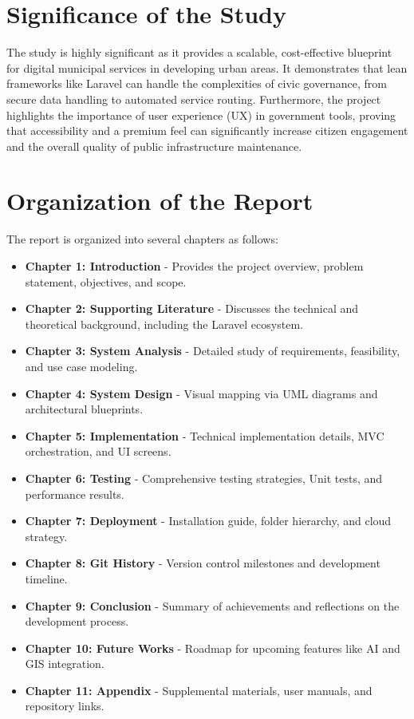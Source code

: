 \section{Significance of the Study}
The study is highly significant as it provides a scalable, cost-effective blueprint for digital municipal services in developing urban areas. It demonstrates that lean frameworks like Laravel can handle the complexities of civic governance, from secure data handling to automated service routing. Furthermore, the project highlights the importance of user experience (UX) in government tools, proving that accessibility and a premium feel can significantly increase citizen engagement and the overall quality of public infrastructure maintenance.

\section{Organization of the Report}
The report is organized into several chapters as follows:
\begin{itemize}
    \item \textbf{Chapter 1: Introduction} - Provides the project overview, problem statement, objectives, and scope.
    \item \textbf{Chapter 2: Supporting Literature} - Discusses the technical and theoretical background, including the Laravel ecosystem.
    \item \textbf{Chapter 3: System Analysis} - Detailed study of requirements, feasibility, and use case modeling.
    \item \textbf{Chapter 4: System Design} - Visual mapping via UML diagrams and architectural blueprints.
    \item \textbf{Chapter 5: Implementation} - Technical implementation details, MVC orchestration, and UI screens.
    \item \textbf{Chapter 6: Testing} - Comprehensive testing strategies, Unit tests, and performance results.
    \item \textbf{Chapter 7: Deployment} - Installation guide, folder hierarchy, and cloud strategy.
    \item \textbf{Chapter 8: Git History} - Version control milestones and development timeline.
    \item \textbf{Chapter 9: Conclusion} - Summary of achievements and reflections on the development process.
    \item \textbf{Chapter 10: Future Works} - Roadmap for upcoming features like AI and GIS integration.
    \item \textbf{Chapter 11: Appendix} - Supplemental materials, user manuals, and repository links.
\end{itemize}

